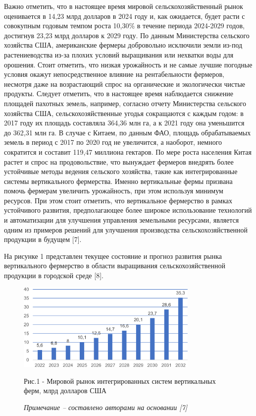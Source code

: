 \begin{multicols}{2}
Важно отметить, что в настоящее время мировой сельскохозяйственный рынок
оценивается в 14,23 млрд долларов в 2024 году и, как ожидается, будет
расти с совокупным годовым темпом роста 10,30\% в течение периода
2024-2029 годов, достигнув 23,23 млрд долларов к 2029 году. По данным
Министерства сельского хозяйства США, американские фермеры добровольно
исключили земли из-под растениеводства из-за плохих условий выращивания
или нехватки воды для орошения. Стоит отметить, что низкая урожайность и
не самые лучшие погодные условия окажут непосредственное влияние на
рентабельности фермеров, несмотря даже на возрастающий спрос на
органические и экологически чистые продукты. Следует отметить, что в
настоящее время наблюдается снижение площадей пахотных земель, например,
согласно отчету Министерства сельского хозяйства США,
сельскохозяйственные угодья сокращаются с каждым годом: в 2017 году их
площадь составляла 364,36 млн га, а к 2021 году она уменьшится до 362,31
млн га. В случае с Китаем, по данным ФАО, площадь обрабатываемых земель
в период с 2017 по 2020 год не увеличится, а наоборот, немного
сократится и составит 119,47 миллиона гектаров. По мере роста населения
Китая растет и спрос на продовольствие, что вынуждает фермеров внедрять
более устойчивые методы ведения сельского хозяйства, такие как
интегрированные системы вертикального фермерства. Именно вертикальные
фермы призвана помочь фермерам увеличить урожайность, при этом используя
минимум ресурсов. При этом стоит отметить, что вертикальное фермерство в
рамках устойчивого развития, предполагающее более широкое использование
технологий и автоматизации для улучшения управления земельными
ресурсами, является одним из примеров решений для улучшения производства
сельскохозяйственной продукции в будущем {[}7{]}.

На рисунке 1 представлен текущее состояние и прогноз развития рынка
вертикального фермерство в области выращивания сельскохозяйственной
продукции в городской среде {[}8{]}.
\end{multicols}

\begin{figure}[H]
	\centering
	\includegraphics[width=0.78\textwidth]{media/ekon4/image10}
	\caption*{Рис.1 - Мировой рынок интегрированных систем вертикальных ферм, млрд долларов США}
	\caption*{\normalfont\emph{Примечание -- составлено авторами на основании {[}7{]}}}
\end{figure}

